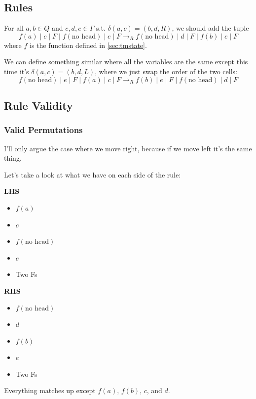\documentclass[12pt]{article}
\begin{document}
\subsection{Rules}

For all $a, b \in Q$ and $c, d, e \in \Gamma$ s.t. $\delta(a, c)=(b, d, R)$, we should add the tuple
\[f(a) \mid c \mid F \mid f(\text{no head}) \mid e \mid F \to_R f(\text{no head}) \mid d \mid F \mid f(b) \mid e \mid F\]
where $f$ is the function defined in \ref{sec:tmstate}.

We can define something similar where all the variables are the same except this time it's $\delta(a, c)=(b, d, L)$,
where we just swap the order of the two cells:
\[f(\text{no head}) \mid e \mid F \mid f(a) \mid c \mid F \to_R f(b) \mid e \mid F \mid f(\text{no head}) \mid d \mid F\]

\pagebreak

\subsection{Rule Validity}

\subsubsection{Valid Permutations}

I'll only argue the case where we move right, because if we move left it's the same thing.

Let's take a look at what we have on each side of the rule:
\begin{multicols}{2}
    \textbf{LHS}
    \begin{itemize}[nolistsep]
        \item $f(a)$
        \item $c$
        \item $f(\text{no head})$
        \item $e$
        \item Two Fs
    \end{itemize}
    \columnbreak
    \textbf{RHS}
    \begin{itemize}[nolistsep]
        \item $f(\text{no head})$
        \item $d$
        \item $f(b)$
        \item $e$
        \item Two Fs
    \end{itemize}
\end{multicols}
Everything matches up except $f(a)$, $f(b)$, $c$, and $d$.
\end{document}
